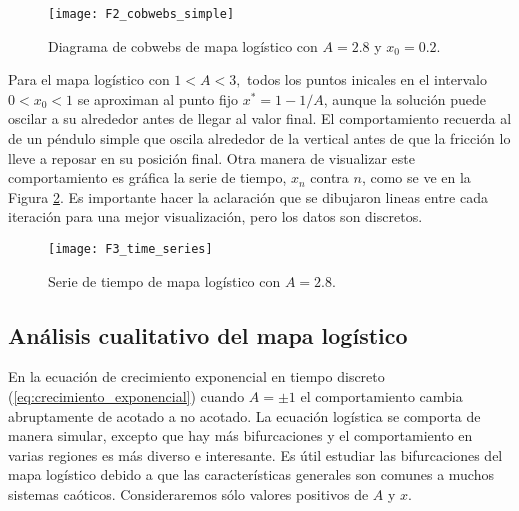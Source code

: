             \begin{figure}[hbtp]
                \centering
                \texttt{[image: F2\_cobwebs\_simple]}
                \caption{Diagrama de cobwebs de mapa logístico con $A = 2.8$ y $x_{0} = 0.2$.}
                \label{fig:F2_cobwebs_simple}
            \end{figure}

            Para el mapa logístico con $1 < A < 3,$ todos los puntos inicales en el intervalo $0 < x_{0} < 1$ se aproximan al punto fijo $x^{*} = 1 - 1/ A $, aunque la solución puede oscilar a su alrededor antes de llegar al valor final. El comportamiento recuerda al de un péndulo simple que oscila alrededor de la vertical antes de que la fricción lo lleve a reposar en su posición final. Otra manera de visualizar este comportamiento es gráfica la serie de tiempo, $x_{n}$ contra $n$, como se ve en la Figura \ref{fig:F3_time_series}. Es importante hacer la aclaración que se dibujaron lineas entre cada iteración para una mejor visualización, pero los datos son discretos. 

            \begin{figure}[hbtp]
                \centering
                \texttt{[image: F3\_time\_series]}
                \caption{Serie de tiempo de mapa logístico con $A = 2.8$.}
                \label{fig:F3_time_series}
            \end{figure}

        \subsection{Análisis cualitativo del mapa logístico }

            En la ecuación de crecimiento exponencial en tiempo discreto (\ref{eq:crecimiento_exponencial}) cuando $A = \pm 1$ el comportamiento cambia abruptamente de acotado a no acotado. La ecuación logística se comporta de manera simular, excepto que hay más bifurcaciones y el comportamiento en varias regiones es más diverso e interesante. Es útil estudiar las bifurcaciones del mapa logístico debido a que las características generales son comunes a muchos sistemas caóticos. Consideraremos sólo valores positivos de $A$ y $x$.

